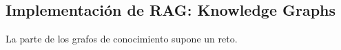\subsection{Implementación de RAG: Knowledge Graphs}
La parte de los grafos de conocimiento supone un reto.